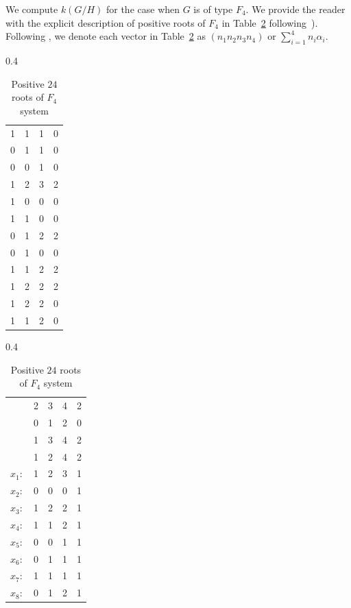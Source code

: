 \documentclass{amsart}
\theoremstyle{definition}
\theoremstyle{remark}
\numberwithin{equation}{section}
\begin{document}
We compute $k(G/H)$ for the case when $G$ is of type $F_{4}$.
We provide the reader with the explicit description of positive roots of $F_{4}$ in Table~\ref{fig:f4} following~\cite[pp. 58--59]{Y25}).
Following \cite{Y25}, we denote each vector in Table~\ref{fig:f4} as $(n_{1}n_{2}n_{3}n_{4})$ or $\sum_{i=1}^{4}n_{i}\alpha_{i}$.
\begin{table}[H]
\centering
\caption{Positive $24$ roots of $F_{4}$ system}\label{fig:f4}
\begin{subtable}{0.4\textwidth}
\centering
\begin{tabular}{llll}
1 & 1 & 1 & 0 \\
0 & 1 & 1 & 0 \\
0 & 0 & 1 & 0 \\
1 & 2 & 3 & 2 \\
1 & 0 & 0 & 0 \\
1 & 1 & 0 & 0 \\
0 & 1 & 2 & 2 \\
0 & 1 & 0 & 0 \\
1 & 1 & 2 & 2 \\
1 & 2 & 2 & 2 \\
1 & 2 & 2 & 0 \\
1 & 1 & 2 & 0
\end{tabular}
\end{subtable}
\begin{subtable}{0.4\textwidth}
\centering
\begin{tabular}{lllll}
          & 2 & 3 & 4 & 2 \\
          & 0 & 1 & 2 & 0 \\
          & 1 & 3 & 4 & 2 \\
          & 1 & 2 & 4 & 2 \\
$x_{1}:$ & 1 & 2 & 3 & 1 \\
$x_{2}:$ & 0 & 0 & 0 & 1 \\
$x_{3}:$ & 1 & 2 & 2 & 1 \\
$x_{4}:$ & 1 & 1 & 2 & 1 \\
$x_{5}:$ & 0 & 0 & 1 & 1 \\
$x_{6}:$ & 0 & 1 & 1 & 1 \\
$x_{7}:$ & 1 & 1 & 1 & 1 \\
$x_{8}:$ & 0 & 1 & 2 & 1
\end{tabular}
\end{subtable}
\end{table}

\end{document}

